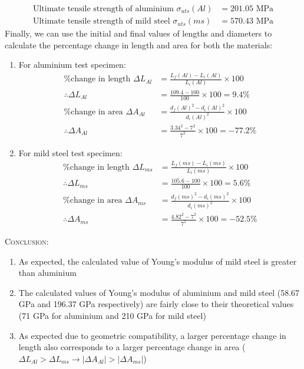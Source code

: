 \documentclass[a4paper, 11pt]{article}
\begin{document}
\begin{align*}
	\text{Ultimate tensile strength of aluminium } \sigma_{uts}(Al)&=201.05\text{ MPa}\\
	\text{Ultimate tensile strength of mild steel } \sigma_{uts}(ms)&=570.43\text{ MPa}
\end{align*}
Finally, we can use the initial and final values of lengths and diameters to calculate the percentage change in length and area for both the materials:
\begin{enumerate}[label=(\alph*)]
	\item For aluminium test specimen:
\begin{align*}
	\text{\% change in length } \Delta L_{Al}&=\frac{L_f(Al)-L_i(Al)}{L_i(Al)}\times 100\\
	\therefore\Delta L_{Al}&=\frac{109.4-100}{100}\times 100 = 9.4\%\\
	\text{\% change in area } \Delta A_{Al}&=\frac{d_f(Al)^2-d_i(Al)^2}{d_i(Al)^2}\times 100\\
	\therefore\Delta A_{Al}&=\frac{3.34^2-7^2}{7^2}\times 100 = -77.2\%
\end{align*}
	\item For mild steel test specimen:
\begin{align*}
	\text{\% change in length } \Delta L_{ms}&=\frac{L_f(ms)-L_i(ms)}{L_i(ms)}\times 100\\
	\therefore\Delta L_{ms}&=\frac{105.6-100}{100}\times 100 = 5.6\%\\
	\text{\% change in area } \Delta A_{ms}&=\frac{d_f(ms)^2-d_i(ms)^2}{d_i(ms)^2}\times 100\\
	\therefore\Delta A_{ms}&=\frac{4.82^2-7^2}{7^2}\times 100 = -52.5\%
\end{align*}
\end{enumerate}

\textsc{Conclusion:}
\begin{enumerate}[label=\roman*)]
		\item As expected, the calculated value of Young's modulus of mild steel is greater than aluminium
		\item The calculated values of Young's modulus of aluminium and mild steel (58.67 GPa and 196.37 GPa respectively) are fairly close to their theoretical values (71 GPa for aluminium and 210 GPa for mild steel)
		\item As expected due to geometric compatibility, a larger percentage change in length also corresponds to a larger percentage change in area ($\Delta L_{Al}>\Delta L_{ms}\rightarrow|\Delta A_{Al}|>|\Delta A_{ms}|$)
	\end{enumerate}
\end{document}
